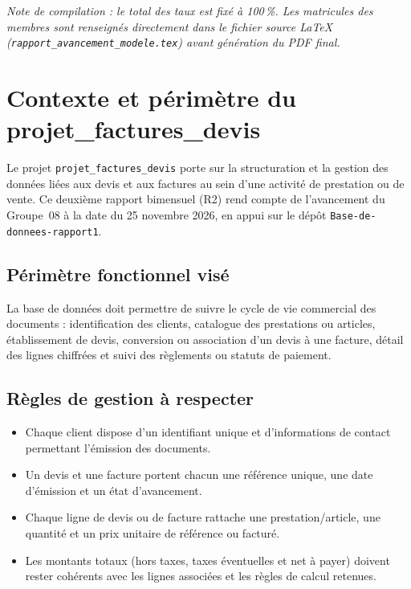 \documentclass[11pt,a4paper]{article}
\begin{document}
\vspace{0.5em}
{\small\textit{Note de compilation : le total des taux est fix\'e \`a 100\,\%. Les matricules des membres sont renseign\'es directement dans le fichier source \LaTeX{} (\texttt{rapport\_avancement\_modele.tex}) avant g\'en\'eration du PDF final.}}

\newpage

\section{Contexte et p\'erim\`etre du projet\_factures\_devis}
Le projet \texttt{projet\_factures\_devis} porte sur la structuration et la gestion des donn\'ees li\'ees aux devis et aux factures au sein d'une activit\'e de prestation ou de vente. Ce deuxi\`eme rapport bimensuel (R2) rend compte de l'avancement du Groupe~08 \`a la date du 25 novembre 2026, en appui sur le d\'ep\^ot \texttt{Base-de-donnees-rapport1}.

\subsection{P\'erim\`etre fonctionnel vis\'e}
La base de donn\'ees doit permettre de suivre le cycle de vie commercial des documents : identification des clients, catalogue des prestations ou articles, \'etablissement de devis, conversion ou association d'un devis \`a une facture, d\'etail des lignes chiffr\'ees et suivi des r\`eglements ou statuts de paiement.

\subsection{R\`egles de gestion \`a respecter}
\begin{itemize}[leftmargin=1.5em]
  \item Chaque client dispose d'un identifiant unique et d'informations de contact permettant l'\'emission des documents.
  \item Un devis et une facture portent chacun une r\'ef\'erence unique, une date d'\'emission et un \'etat d'avancement.
  \item Chaque ligne de devis ou de facture rattache une prestation/article, une quantit\'e et un prix unitaire de r\'ef\'erence ou factur\'e.
  \item Les montants totaux (hors taxes, taxes \'eventuelles et net \`a payer) doivent rester coh\'erents avec les lignes associ\'ees et les r\`egles de calcul retenues.
\end{itemize}
\end{document}
